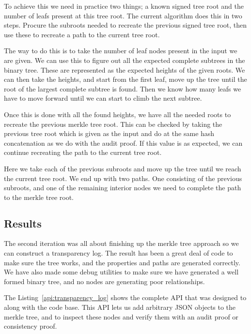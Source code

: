 \documentclass[../Main/thesis.tex]{subfiles}
\begin{document}
To achieve this we need in practice two things; a known signed tree root and the
number of leafs present at this tree root. The current algorithm does this in
two steps. Procure the subroots needed to recreate the previous signed tree
root, then use these to recreate a path to the current tree root. 

The way to do this is to take the number of leaf nodes present in the input we
are given. We can use this to figure out all the expected complete subtrees in
the binary tree. These are represented as the expected heights of the given
roots. We can then take the heights, and start from the first leaf, move up the
tree until the root of the largest complete subtree is found. Then we know how
many leafs we have to move forward until we can start to climb the next subtree.

Once this is done with all the found heights, we have all the needed roots to
recreate the previous merkle tree root. This can be checked by taking the
previous tree root which is given as the input and do at the same hash
concatenation as we do with the audit proof. If this value is as expected, we
can continue recreating the path to the current tree root.

Here we take each of the previous subroots and move up the tree until we reach
the current tree root. We end up with two paths. One consisting of the previous
subroots, and one of the remaining interior nodes we need to complete the path
to the merkle tree root.

\subsection*{Results}%
\label{sub:second_iteration_results}
The second iteration was all about finishing up the merkle tree approach so we
can construct a transparency log. The result has been a great deal of code to
make sure the tree works, and the properties and paths are generated correctly.
We have also made some debug utilities to make sure we have generated a well
formed binary tree, and no nodes are generating poor relationships.

The Listing~\ref{api:transparency_log} shows the complete API that was designed
to along with the code base. This API lets us add arbitrary JSON objects to the
merkle tree, and to inspect these nodes and verify them with an audit proof or
consistency proof.
\end{document}
